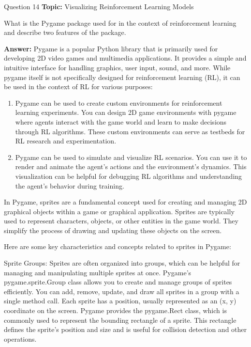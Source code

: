 \begin{frame}{Question 14}
    \textbf{Topic:} Visualizing Reinforcement Learning Models
    \vspace{10pt}

    What is the Pygame package used for in the context of reinforcement learning and describe two features of the package. 
    \vspace{20pt}

    \textbf{Answer:}
    Pygame is a popular Python library that is primarily used for developing 2D video games and multimedia applications. It provides a simple and intuitive interface for handling graphics, user input, sound, and more. While pygame itself is not specifically designed for reinforcement learning (RL), it can be used in the context of RL for various purposes:
\end{frame}
\begin{frame}
    \begin{enumerate}
        \item Pygame can be used to create custom environments for reinforcement learning experiments. You can design 2D game environments with pygame where agents interact with the game world and learn to make decisions through RL algorithms. These custom environments can serve as testbeds for RL research and experimentation.
        \item Pygame can be used to simulate and visualize RL scenarios. You can use it to render and animate the agent's actions and the environment's dynamics. This visualization can be helpful for debugging RL algorithms and understanding the agent's behavior during training.
    \end{enumerate}
    
\end{frame}
\begin{frame}
    In Pygame, sprites are a fundamental concept used for creating and managing 2D graphical objects within a game or graphical application. Sprites are typically used to represent characters, objects, or other entities in the game world. They simplify the process of drawing and updating these objects on the screen.

Here are some key characteristics and concepts related to sprites in Pygame:

Sprite Groups: Sprites are often organized into groups, which can be helpful for managing and manipulating multiple sprites at once. Pygame's pygame.sprite.Group class allows you to create and manage groups of sprites efficiently. You can add, remove, update, and draw all sprites in a group with a single method call.
Each sprite has a position, usually represented as an (x, y) coordinate on the screen. Pygame provides the pygame.Rect class, which is commonly used to represent the bounding rectangle of a sprite. This rectangle defines the sprite's position and size and is useful for collision detection and other operations.
\end{frame}
